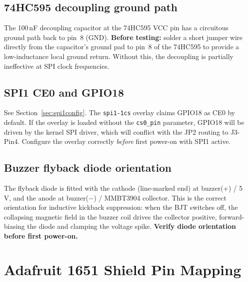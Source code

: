 \documentclass[11pt,a4paper]{article}
\begin{document}
\subsection{74HC595 decoupling ground path}

The 100\,nF decoupling capacitor at the 74HC595 VCC pin has a circuitous
ground path back to pin~8 (GND).
\textbf{Before testing:} solder a short jumper wire directly from the capacitor's
ground pad to pin~8 of the 74HC595 to provide a low-inductance local ground return.
Without this, the decoupling is partially ineffective at SPI clock frequencies.

\subsection{SPI1 CE0 and GPIO18}

See Section~\ref{sec:spi1config}.
The \texttt{spi1-1cs} overlay claims GPIO18 as CE0 by default.
If the overlay is loaded without the \texttt{cs0\_pin} parameter,
GPIO18 will be driven by the kernel SPI driver, which will conflict
with the JP2 routing to J3-Pin4.
Configure the overlay correctly \emph{before} first power-on with SPI1 active.

\subsection{Buzzer flyback diode orientation}

The flyback diode is fitted with the cathode (line-marked end) at buzzer(+) / 5\,V,
and the anode at buzzer($-$) / MMBT3904 collector.
This is the correct orientation for inductive kickback suppression:
when the BJT switches off, the collapsing magnetic field in the buzzer coil
drives the collector positive, forward-biasing the diode and clamping
the voltage spike.
\textbf{Verify diode orientation before first power-on.}

\section{Adafruit 1651 Shield Pin Mapping}
\label{sec:1651}

\vspace{4pt}
\renewcommand{\arraystretch}{1.30}
\end{document}
